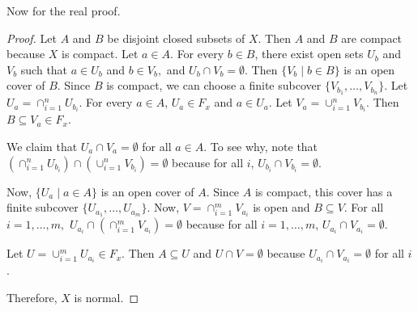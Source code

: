 Now for the real proof.

\begin{proof}
Let $A$ and $B$ be disjoint closed subsets of $X$.  Then $A$ and $B$ are compact because $X$ is compact.  Let $a \in A$.  For every $b \in B$, there exist open sets $U_b$ and $V_b$ such that $a \in U_b$ and $b \in V_b,$ and $U_b \cap V_b = \emptyset.$  Then $\{V_b \mid b \in B\}$ is an open cover of $B$.  Since $B$ is compact, we can choose a finite subcover $\{V_{b_1},\ldots,V_{b_n}\}.$  Let $U_a=\cap_{i=1}^n U_{b_i}$.  For every $a \in A$, $U_a \in F_x$ and $a \in U_a.$  Let $V_a=\cup_{i=1}^n V_{b_i}$.  Then $B \subseteq V_a  \in F_x$.  

We claim that $U_a \cap V_a = \emptyset$ for all $a \in A$.  To see why, note that $\left( \cap_{i=1}^n U_{b_i}\right) \cap \left( \cup_{i=1}^n V_{b_i} \right) = \emptyset$ because for all $i$, $U_{b_i} \cap V_{b_i}=\emptyset.$

Now, $\{U_a \mid a \in A\}$ is an open cover of $A$.  Since $A$ is compact, this cover has a finite subcover $\{U_{a_1},\ldots,U_{a_m}\}$.  Now, $V=\cap_{i=1}^{m}V_{a_i}$ is open and $B \subseteq V$. For all $i=1,\ldots,m,$ $U_{a_i}\cap \left( \cap_{i=1}^m V_{a_i} \right) = \emptyset$ because for all $i=1,\ldots,m$, $U_{a_i} \cap V_{a_i}=\emptyset$.   

Let $U=\cup_{i=1}^m U_{a_i} \in F_x$.  Then $A \subseteq U$ and $U \cap V = \emptyset$ because $U_{a_i} \cap V_{a_i}=\emptyset$ for all $i$.

Therefore, $X$ is normal.  
\end{proof}

